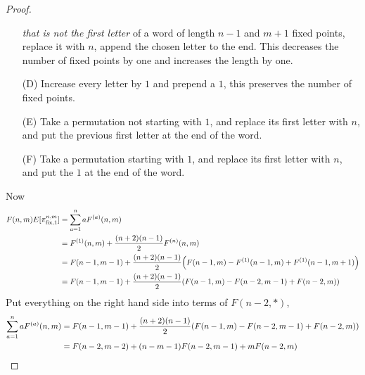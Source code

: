 \documentclass{article}
\let\originalleft\left
\let\originalright\right
\renewcommand{\left}{\mathopen{}\mathclose\bgroup\originalleft}
\renewcommand{\right}{\aftergroup\egroup\originalright}
\begin{document}
\begin{proof}
\begin{enumerate}[(A')]
    \textit{that is not the first letter} of a word of length $n-1$ and $m+1$
    fixed points, replace it with $n$, append the chosen letter to the end. This
    decreases the number of fixed points by one and increases the length by one.
    \item[(D)] Increase every letter by $1$ and prepend a $1$, this preserves
    the number of fixed points.
    \item[(E)] Take a permutation not starting with $1$, and replace its first
    letter with $n$, and put the previous first letter at the end of the word.
    \item[(F)] Take a permutation starting with $1$, and replace its first
    letter with $n$, and put the $1$ at the end of the word.
  \end{enumerate}
  Now \begin{align}
    F(n,m)E[\pi_{\text{fix},1}^{n,m}]
    &= \sum_{a=1}^n aF^{(a)}(n, m) \\
    &= F^{(1)}(n, m) + \frac{(n+2)(n-1)}{2}F^{(n)}(n,m) \\
    &= F(n-1, m-1) + \frac{(n+2)(n-1)}{2}\left(F(n-1,m) - F^{(1)}(n-1, m) + F^{(1)}(n-1, m+1)\right) \\
    &= F(n-1, m-1) + \frac{(n+2)(n-1)}{2}\left(F(n-1,m) - F(n-2, m-1) + F(n-2, m)\right) \\
  \end{align}
  Put everything on the right hand side into terms of $F(n-2, *)$,
  \begin{align}
    \sum_{a=1}^n aF^{(a)}(n, m)
    &= F(n-1, m-1) + \frac{(n+2)(n-1)}{2}\left(F(n-1,m) - F(n-2, m-1) + F(n-2, m)\right) \\
    &= F(n - 2, m-2) + (n - m - 1)F(n - 2, m-1) + mF(n-2, m) \\

\end{align}
\end{proof}
\end{document}
